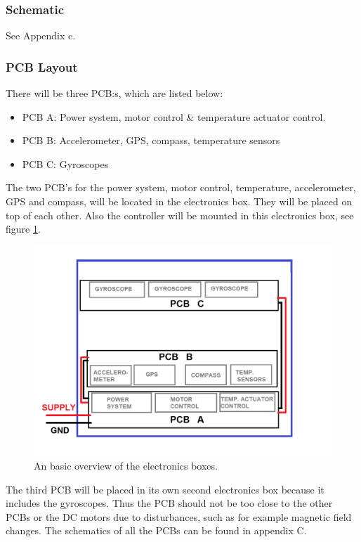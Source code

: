 
\subsubsection{Schematic}
See Appendix c.

\subsubsection{PCB Layout}
There will be three PCB:s, which are listed below:

\begin{itemize}
	\item 	PCB A: Power system, motor control \& temperature actuator control.
	\item	PCB B: Accelerometer, GPS, compass, temperature sensors
	\item 	PCB C: Gyroscopes
\end{itemize}



The two PCB's for the power system, motor control, temperature, accelerometer, GPS and compass, will be located in the electronics box. They will be placed on top of each other. Also the controller will be mounted in this electronics box, see figure \ref{fig:electronic-box}.

\begin{figure}[H]
	\centering
	\includegraphics[scale=0.5]{4-experiment-design/img/electrical/ElectricalBox.png}
	\caption{An basic overview of the electronics boxes.}
	\label{fig:electronic-box}
\end{figure}


The third PCB will be placed in its own second electronics box because it includes the gyroscopes. Thus the PCB should not be too close to the other PCBs or the DC motors due to disturbances, such as for example magnetic field changes. The schematics of all the PCBs can be found in appendix C.
\raggedbottom
